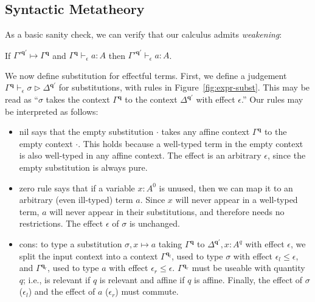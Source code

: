 \documentclass[acmsmall,screen,review]{acmart}
\newcommand{\mb}[1]{\ensuremath{\mathbf{#1}}}
\newcommand{\cwk}[2]{#1 \mapsto #2}
\newcommand{\rle}[1]{{\scriptsize\textsf{#1}}}
\newcommand{\hasty}[4]{#1 \vdash_{#2} #3: {#4}}
\newcommand{\issubst}[4]{#1 \vdash_{#2} #3 \rhd #4}
\newcommand{\brle}[1]{{\textsf{#1}}}
\begin{document}
\subsection{Syntactic Metatheory}

As a basic sanity check, we can verify that our calculus admits \emph{weakening}:
\begin{lemma}[name=Weakening, restate=synmonwk]
  If ${\cwk{\Gamma'^{\mb{q}'}}{\Gamma^{\mb{q}}}}$ and ${\hasty{\Gamma^{\mb{q}}}{\epsilon}{a}{A}}$ then
  ${\hasty{\Gamma'^{\mb{q}'}}{\epsilon}{a}{A}}$. 
\end{lemma}

We now define substitution for effectful terms. First, we define a judgement $\issubst{\Gamma^{\mb{q}}}{\epsilon}{\sigma}{\Delta^{\mb{q}'}}$
for substitutions, with rules in Figure~\ref{fig:expr-subst}. This may be read as ``$\sigma$ takes the
context $\Gamma^{\mb{q}}$ to the context $\Delta^{\mb{q}'}$ with effect $\epsilon$.'' Our rules may
be interpreted as follows:
\begin{itemize}
  \item \brle{nil} says that the empty substitution $\cdot$ takes any affine context
  $\Gamma^{\mb{q}}$ to the empty context $\cdot$. This holds because a
  well-typed term in the empty context is also well-typed in any affine context. The effect is an
  arbitrary $\epsilon$, since the empty substitution is always pure.
  \item  \brle{zero} rule says that if a variable $x : A^0$ is
  unused, then we can map it to an arbitrary (even ill-typed) term $a$. Since $x$ will 
  never appear in a well-typed term, $a$ will never appear in their
  substitutions, and therefore needs no restrictions. The effect $\epsilon$ of
  $\sigma$ is unchanged.
  \item \brle{cons}: to type a substitution $\sigma, x \mapsto a$ taking  $\Gamma^{\mb{q}}$ to
  $\Delta^{\mb{q}'}, x: A^q$ with effect $\epsilon$, we split the input context into a context
  $\Gamma^{\mb{q}_l}$, used to type $\sigma$ with effect $\epsilon_l \leq \epsilon$, and
  $\Gamma^{\mb{q}_r}$, used to type $a$ with effect $\epsilon_r \leq \epsilon$.  $\Gamma^{\mb{q}_r}$
  must be useable with quantity $q$; i.e., is relevant if $q$ is
  relevant and affine if $q$ is affine. Finally, the effect of $\sigma$
  ($\epsilon_l$) and the effect of $a$ ($\epsilon_r$) must commute.
\end{itemize}
\end{document}
